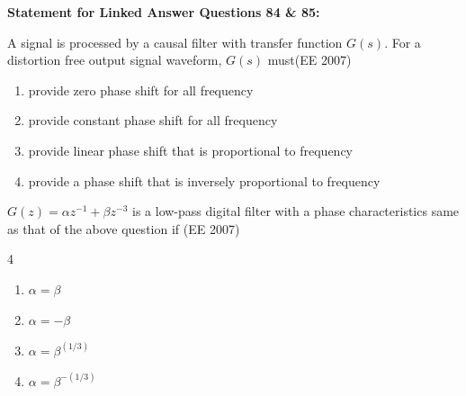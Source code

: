 \textbf{Statement for Linked Answer Questions 84 \& 85:}\\
\item A signal is processed by a causal filter with transfer function $G(s)$. For a distortion free output signal waveform, $G(s)$ must\hfill{(EE 2007)}

\begin{enumerate}
\item[(A)] provide zero phase shift for all frequency
\item[(B)] provide constant phase shift for all frequency
\item[(C)] provide linear phase shift that is proportional to frequency
\item[(D)] provide a phase shift that is inversely proportional to frequency
\end{enumerate}

\item 
$G(z) = \alpha z^{-1} + \beta z^{-3}$ is a low-pass digital filter with a phase characteristics same as that of the above question if
\hfill{(EE 2007)}
\begin{multicols}{4}
\begin{enumerate}
  \item  $\alpha = \beta$ 
\item  $\alpha = -\beta$
\item  $\alpha = \beta^{(1/3)}$ 
\item  $\alpha = \beta^{-(1/3)}$  
\end{enumerate}
\end{multicols}

